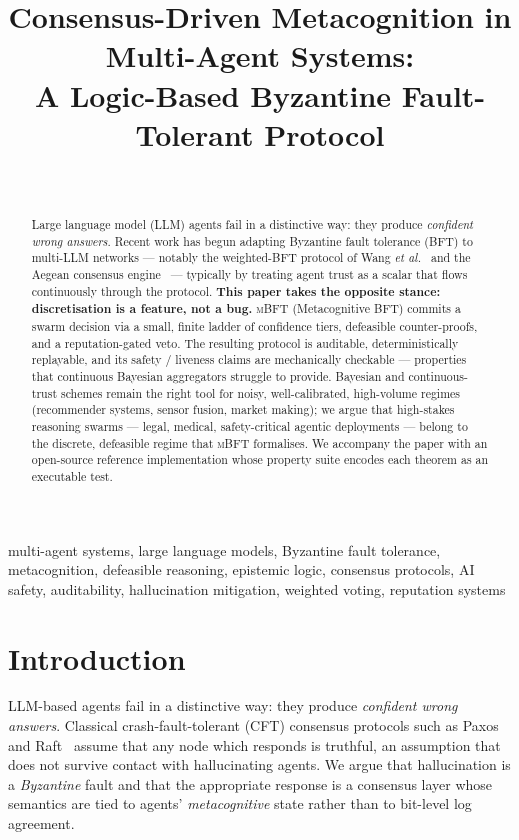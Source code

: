 \documentclass[11pt,conference]{IEEEtran}
\title{Consensus-Driven Metacognition in Multi-Agent Systems:\\
A Logic-Based Byzantine Fault-Tolerant Protocol}
\author{\IEEEauthorblockN{Saurav Bhattacharya}\\
\IEEEauthorblockA{The New World Foundation\\
Email: president@thenewworldfoundation.com}}
\newcommand{\mbft}{\textsc{mBFT}}
\begin{document}
\maketitle

\begin{abstract}
Large language model (LLM) agents fail in a distinctive way: they
produce \emph{confident wrong answers}. Recent work has begun adapting
Byzantine fault tolerance (BFT) to multi-LLM networks --- notably the
weighted-BFT protocol of Wang \emph{et al.}~\cite{wang2025wbft} and the
Aegean consensus engine~\cite{aegean2025} --- typically by treating
agent trust as a scalar that flows continuously through the protocol.
\textbf{This paper takes the opposite stance: discretisation is a
feature, not a bug.} \mbft{} (Metacognitive BFT) commits a swarm
decision via a small, finite ladder of confidence tiers, defeasible
counter-proofs, and a reputation-gated veto. The resulting protocol is
auditable, deterministically replayable, and its safety / liveness
claims are mechanically checkable --- properties that continuous
Bayesian aggregators struggle to provide. Bayesian and continuous-trust
schemes remain the right tool for noisy, well-calibrated, high-volume
regimes (recommender systems, sensor fusion, market making); we argue
that high-stakes reasoning swarms --- legal, medical, safety-critical
agentic deployments --- belong to the discrete, defeasible regime that
\mbft{} formalises. We accompany the paper with an open-source
reference implementation whose property suite encodes each theorem as
an executable test.
\end{abstract}

\begin{IEEEkeywords}
multi-agent systems, large language models, Byzantine fault tolerance,
metacognition, defeasible reasoning, epistemic logic, consensus
protocols, AI safety, auditability, hallucination mitigation,
weighted voting, reputation systems
\end{IEEEkeywords}

\section{Introduction}
\label{sec:intro}

LLM-based agents fail in a distinctive way: they produce
\emph{confident wrong answers}. Classical crash-fault-tolerant (CFT)
consensus protocols such as Paxos~\cite{lamport1998paxos} and
Raft~\cite{ongaro2014raft} assume that any node which responds is
truthful, an assumption that does not survive contact with hallucinating
agents. We argue that hallucination is a \emph{Byzantine} fault and that
the appropriate response is a consensus layer whose semantics are tied
to agents' \emph{metacognitive} state rather than to bit-level log
agreement.
\end{document}
